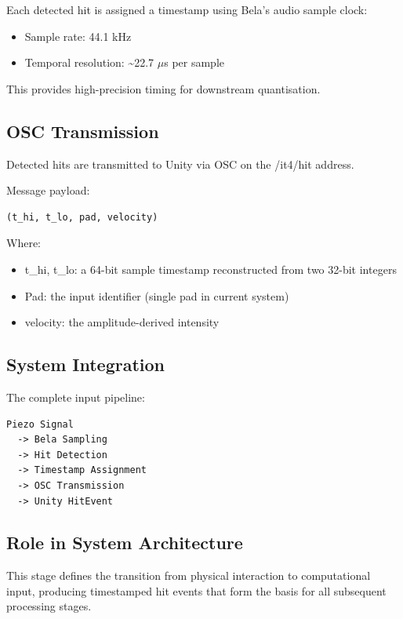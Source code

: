 Each detected hit is assigned a timestamp using Bela's audio sample
clock:

\begin{itemize}
\item
  Sample rate: 44.1 kHz
\item
  Temporal resolution: \textasciitilde22.7 \(\mu\)s per sample
\end{itemize}

This provides high-precision timing for downstream quantisation.

\subsection{OSC Transmission}\label{osc-transmission}

Detected hits are transmitted to Unity via OSC on the /it4/hit address.

Message payload:

\begin{lstlisting}
(t_hi, t_lo, pad, velocity)
\end{lstlisting}

Where:

\begin{itemize}
\item
  t\_hi, t\_lo: a 64-bit sample timestamp reconstructed from two 32-bit
  integers
\item
  Pad: the input identifier (single pad in current system)
\item
  velocity: the amplitude-derived intensity
\end{itemize}

\subsection{System Integration}\label{system-integration}

The complete input pipeline:

\begin{lstlisting}
Piezo Signal
  -> Bela Sampling
  -> Hit Detection
  -> Timestamp Assignment
  -> OSC Transmission
  -> Unity HitEvent
\end{lstlisting}

\subsection{Role in System Architecture}\label{role-in-system-architecture}

This stage defines the transition from physical interaction to
computational input, producing timestamped hit events that form the
basis for all subsequent processing stages.

